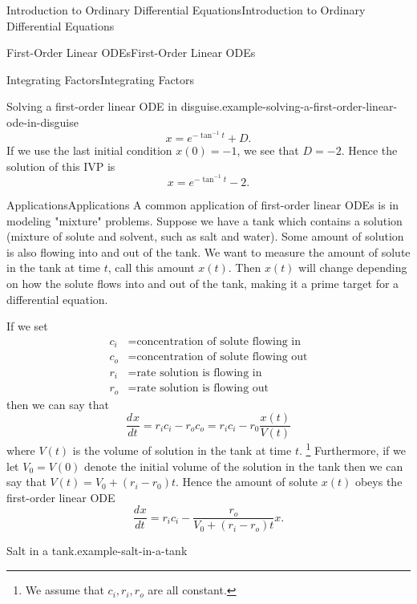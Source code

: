 \documentclass[10pt,]{book}
\numberwithin{equation}{section}
\newcommand{\dv}[3][]{\dfrac{d^{#1} #2}{d #3^{#1}}}
\begin{document}
\begin{chapterptx}{Introduction to Ordinary Differential Equations}{}{Introduction to Ordinary Differential Equations}{}{}
\begin{sectionptx}{First-Order Linear ODEs}{}{First-Order Linear ODEs}{}{}
\begin{subsectionptx}{Integrating Factors}{}{Integrating Factors}{}{}
\begin{example}{Solving a first-order linear ODE in disguise.}{example-solving-a-first-order-linear-ode-in-disguise}
\begin{equation*}
x = e^{-\tan^{-1}t}+D.
\end{equation*}
If we use the last initial condition \(x(0)=-1\), we see that \(D = -2\). Hence the solution of this IVP is%
\begin{equation*}
x = e^{-\tan^{-1}t}-2.
\end{equation*}
%
\end{example}
\end{subsectionptx}
%
%
\typeout{************************************************}
\typeout{************************************************}
%
\begin{subsectionptx}{Applications}{}{Applications}{}{}\label{subsection-applications}
\hypertarget{p-85}{}%
A common application of first-order linear ODEs is in modeling "mixture" problems. Suppose we have a tank which contains a solution (mixture of solute and solvent, such as salt and water). Some amount of solution is also flowing into and out of the tank. We want to measure the amount of solute in the tank at time \(t\), call this amount \(x(t)\). Then \(x(t)\) will change depending on how the solute flows into and out of the tank, making it a prime target for a differential equation.%
\par
\hypertarget{p-86}{}%
If we set%
\begin{align*}
c_{i} & =\text{concentration of solute flowing in} \\
c_{o} & =\text{concentration of solute flowing out} \\
r_{i} & =\text{rate solution is flowing in} \\
r_{o} & = \text{rate solution is flowing out} 
\end{align*}
then we can say that%
\begin{equation*}
\dv{x}{t} = r_{i}c_{i} - r_{o}c_{o} = r_{i}c_{i} - r_{0}\frac{x(t)}{V(t)}
\end{equation*}
where \(V(t)\) is the volume of solution in the tank at time \(t\). \footnote{We assume that \(c_{i},r_{i},r_{o}\) are all constant.\label{fn-4}} Furthermore, if we let \(V_{0} = V(0)\) denote the initial volume of the solution in the tank then we can say that \(V(t) = V_{0} + (r_{i}-r_{0})t.\) Hence the amount of solute \(x(t)\) obeys the first-order linear ODE%
\begin{equation*}
\dv{x}{t} = r_{i}c_{i} - \frac{r_{o}}{V_{0}+(r_{i}-r_{o})t}x.
\end{equation*}
%
\begin{example}{Salt in a tank.}{example-salt-in-a-tank}%

\end{example}
\end{subsectionptx}
\end{sectionptx}
\end{chapterptx}
\end{document}
